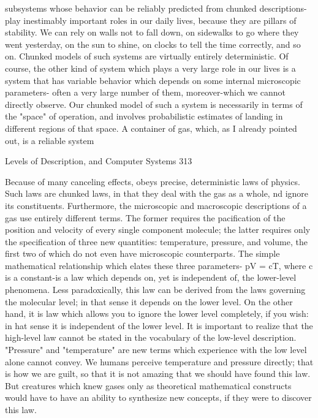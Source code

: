        subsystems whose behavior can be reliably predicted from chunked descriptions-
       play inestimably important roles in our daily lives, because they are pillars of
       stability. We can rely on walls not to fall down, on sidewalks to go where they
       went yesterday, on the sun to shine, on clocks to tell the time correctly, and so on.
       Chunked models of such systems are virtually entirely deterministic. Of course,
       the other kind of system which plays a very large role in our lives is a system that
       has variable behavior which depends on some internal microscopic parameters-
       often a very large number of them, moreover-which we cannot directly observe.
       Our chunked model of such a system is necessarily in terms of the "space" of
       operation, and involves probabilistic estimates of landing in different regions of
       that space.
                A container of gas, which, as I already pointed out, is a reliable system



Levels of Description, and Computer Systems                                             313

       Because of many canceling effects, obeys precise, deterministic laws of physics.
       Such laws are chunked laws, in that they deal with the gas as a whole, nd ignore
       its constituents. Furthermore, the microscopic and macroscopic descriptions of a
       gas use entirely different terms. The former requires the pacification of the
       position and velocity of every single component molecule; the latter requires only
       the specification of three new quantities: temperature, pressure, and volume, the
       first two of which do not even have microscopic counterparts. The simple
       mathematical relationship which elates these three parameters- pV = cT, where c
       is a constant-is a law which depends on, yet is independent of, the lower-level
       phenomena. Less paradoxically, this law can be derived from the laws governing
       the molecular level; in that sense it depends on the lower level. On the other hand,
       it is law which allows you to ignore the lower level completely, if you wish: in hat
       sense it is independent of the lower level.
                It is important to realize that the high-level law cannot be stated in the
       vocabulary of the low-level description. "Pressure" and "temperature" are new
       terms which experience with the low level alone cannot convey. We humans
       perceive temperature and pressure directly; that is how we are guilt, so that it is
       not amazing that we should have found this law. But creatures which knew gases
       only as theoretical mathematical constructs would have to have an ability to
       synthesize new concepts, if they were to discover this law.

